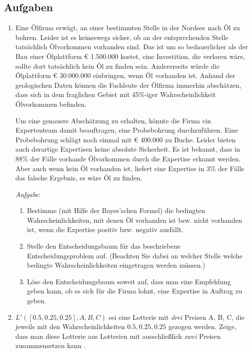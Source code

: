 \subsection{Aufgaben}
\begin{enumerate}


\item Eine Ölfirma erwägt, an einer
bestimmten Stelle in der Nordsee nach Öl zu bohren. Leider ist es keineswegs
sicher, ob an der entsprechenden Stelle tatsächlich Ölvorkommen vorhanden sind.
Das ist um so bedauerlicher als der Bau einer Ölplattform € 1.500.000 kostet,
eine Investition, die verloren wäre, sollte dort tatsächlich kein Öl zu finden
sein. Andererseits würde die Ölplattform € 30.000.000 
einbringen, wenn Öl vorhanden ist. Anhand
der geologischen Daten können die Fachleute der Ölfirma immerhin abschätzen, 
dass sich in dem fraglichen Gebiet mit 45\%-iger Wahrscheinlichkeit Ölvorkommen
befinden.

Um eine genauere Abschätzung zu erhalten, könnte die Firma ein 
Expertenteam damit beauftragen, eine Probebohrung durchzuführen. Eine
Probebohrung schlägt noch einmal mit € 400.000 zu Buche.
Leider bieten auch derartige Expertisen keine absolute Sicherheit. Es ist
bekannt, dass in 88\% der Fälle vorhande Ölvorkommen durch die Expertise
erkannt werden. Aber auch wenn kein Öl
vorhanden ist, liefert eine Expertise in 3\% der Fälle das falsche
Ergebnis, es wäre Öl zu finden.

{\em Aufgabe}:
\begin{enumerate}
\item Bestimme (mit Hilfe der Bayes'schen Formel) die bedingten
Wahrscheinlichkeiten, mit denen Öl vorhanden ist bzw. nicht vorhanden ist, 
wenn die Expertise positiv bzw. negativ ausfällt.
\item Stelle den Entscheidungsbaum für das beschriebene
Entscheidungsproblem auf. (Beachten Sie dabei an welcher Stelle welche bedingte
Wahrscheinlichkeiten eingetragen werden müssen.)
\item Löse den Entscheidungsbaum soweit auf, dass man eine Emp\-fehl\-ung geben
kann, ob es sich für die Firma lohnt, eine Expertise in Auftrag zu geben.
\end{enumerate}

\item $L'([0.5, 0.25, 0.25], A, B, C)$ sei eine Lotterie mit {\em drei} Preisen
A, B, C, die jeweils mit den Wahrscheinlichkeiten $0.5, 0.25, 0.25$ gezogen
werden. Zeige, dass man diese Lotterie aus Lotterien mit ausschließlich {\em
zwei} Preisen zusammensetzen kann \cite[S. 91]{resnik:1987}. 


\end{enumerate}
